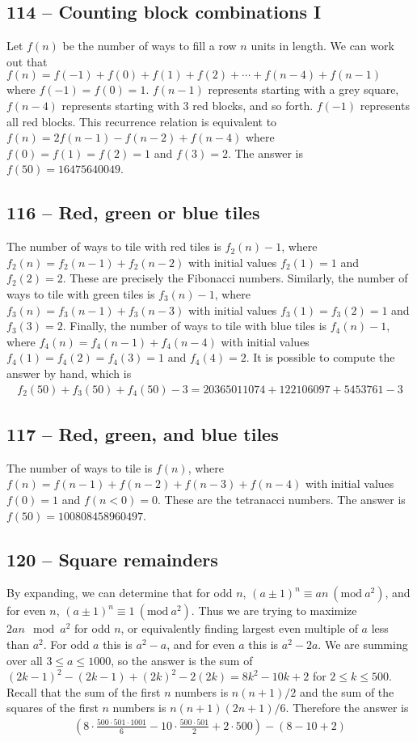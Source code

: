 \documentclass{article}
\newcommand{\Mod}[1]{\ (\mathrm{mod}\ #1)}
\begin{document}
\subsection*{114 -- Counting block combinations I}
Let $f(n)$ be the number of ways to fill a row $n$ units in length.
We can work out that $f(n) = f(-1) + f(0) + f(1) + f(2) + \cdots + f(n-4) + f(n-1)$ where $f(-1) = f(0) = 1$.
$f(n-1)$ represents starting with a grey square, $f(n-4)$ represents starting with 3 red blocks, and so forth.
$f(-1)$ represents all red blocks.
This recurrence relation is equivalent to $f(n) = 2f(n-1) - f(n-2) + f(n-4)$ where $f(0) = f(1) = f(2) = 1$ and $f(3) = 2$.
The answer is $f(50) = \boxed{16475640049}$.


\subsection*{116 -- Red, green or blue tiles}
The number of ways to tile with red tiles is $f_2(n)-1$, where $f_2(n) = f_2(n-1) + f_2(n-2)$ with initial values $f_2(1) = 1$ and $f_2(2) = 2$.
These are precisely the Fibonacci numbers.
Similarly, the number of ways to tile with green tiles is $f_3(n)-1$, where $f_3(n) = f_3(n-1) + f_3(n-3)$ with initial values $f_3(1) = f_3(2) = 1$ and $f_3(3) = 2$.
Finally, the number of ways to tile with blue tiles is $f_4(n)-1$, where $f_4(n) = f_4(n-1) + f_4(n-4)$ with initial values $f_4(1) = f_4(2) = f_4(3) = 1$ and $f_4(4) = 2$.
It is possible to compute the answer by hand, which is
\begin{align*}
	f_2(50) + f_3(50) + f_4(50) - 3 = \boxed{20365011074 + 122106097 + 5453761 - 3}
\end{align*}


\subsection*{117 -- Red, green, and blue tiles}
The number of ways to tile is $f(n)$, where $f(n) = f(n-1) + f(n-2) + f(n-3) + f(n-4)$ with initial values $f(0) = 1$ and $f(n<0) = 0$.
These are the tetranacci numbers.
The answer is $f(50) = \boxed{100808458960497}$.


\subsection*{120 -- Square remainders}
By expanding, we can determine that for odd $n$, $(a \pm 1)^n \equiv an \Mod{a^2}$, and for even $n$, $(a \pm 1)^n \equiv 1 \Mod{a^2}$.
Thus we are trying to maximize $2an \mod a^2$ for odd $n$, or equivalently finding largest even multiple of $a$ less than $a^2$.
For odd $a$ this is $a^2 - a$, and for even $a$ this is $a^2 - 2a$.
We are summing over all $3 \leq a \leq 1000$, so the answer is the sum of $(2k-1)^2 - (2k-1) + (2k)^2 - 2(2k) = 8k^2 - 10k + 2$ for $2 \leq k \leq 500$.
Recall that the sum of the first $n$ numbers is $n(n+1)/2$ and the sum of the squares of the first $n$ numbers is $n(n+1)(2n+1)/6$.
Therefore the answer is
\begin{align*}
	\boxed{ \left(8\cdot\frac{500\cdot501\cdot1001}{6} - 10\cdot\frac{500\cdot501}{2} + 2\cdot500\right) - (8-10+2) }
\end{align*}
\end{document}
